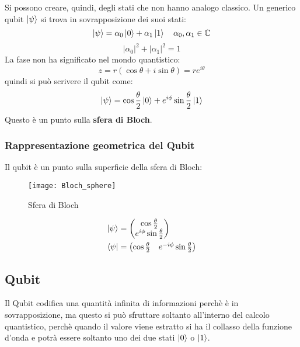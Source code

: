 \documentclass[a4paper]{article}
\begin{document}
\vspace{1em}
\noindent
Si possono creare, quindi, degli stati che non hanno analogo classico. Un generico qubit
\( \ket{\psi} \) si trova in sovrapposizione dei suoi stati:
\[
  \ket{\psi} = \alpha_0 \ket{0} + \alpha_1 \ket{1} \quad \alpha_0, \alpha_1 \in \mathbb{C}
\] 
\[
  |\alpha_0|^2 + |\alpha_1|^2 = 1
\] 
La fase non ha significato nel mondo quantistico:
\[
  z = r \left( \cos \theta  + i \sin \theta  \right) = r e^{i \theta }
\] 
quindi si può scrivere il qubit come:
\[
  \ket{\psi} = \cos \frac{\theta }{2} \ket{0} + e^{i \phi } \sin \frac{\theta }{2} \ket{1}
\]
Questo è un punto sulla \textbf{sfera di Bloch}.

\subsubsection{Rappresentazione geometrica del Qubit}
Il qubit è un punto sulla superficie della sfera di Bloch:
\begin{figure}[H]
  \centering
  \texttt{[image: Bloch\_sphere]}
  \caption{Sfera di Bloch}
\end{figure}
\[
  \begin{aligned}
    \ket{\psi} &= \begin{pmatrix} 
      \cos \frac{\theta }{2}\\
      e^{i \phi } \sin \frac{\theta }{2}
    \end{pmatrix} \\
    \bra{\psi} &= \begin{pmatrix} 
      \cos \frac{\theta }{2} & e^{-i \phi } \sin \frac{\theta }{2}
    \end{pmatrix}
  \end{aligned}
\] 

\subsection{Qubit}
Il Qubit codifica una quantità infinita di informazioni perchè è in sovrapposizione, ma
questo si può sfruttare soltanto all'interno del calcolo quantistico, perchè quando il
valore viene estratto si ha il collasso della funzione d'onda e potrà essere soltanto uno
dei due stati \( \ket{0} \) o \( \ket{1} \).
\end{document}
